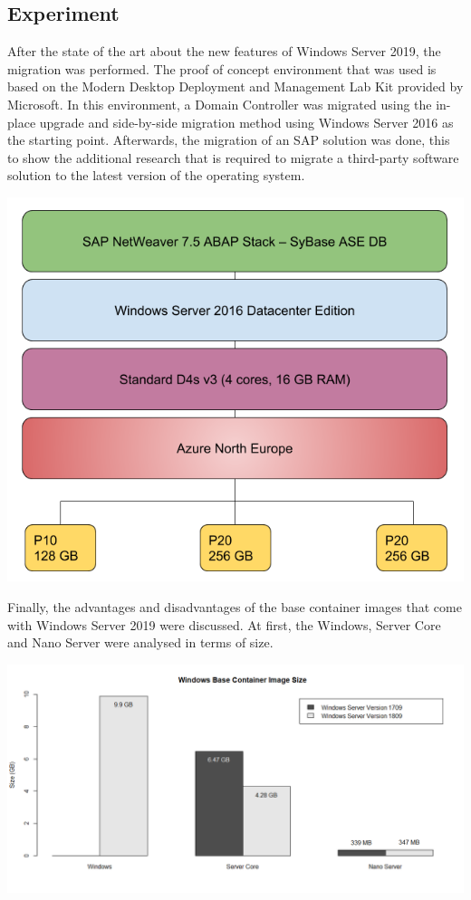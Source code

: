 \documentclass[a0,portrait]{a0poster}
\begin{document}
\begin{multicols}{2}
\section*{Experiment}
\color{black}
After the state of the art about the new features of Windows Server 2019, the migration was performed.
The proof of concept environment that was used is based on the Modern Desktop Deployment and Management Lab Kit provided by Microsoft. 
In this environment, a Domain Controller was migrated using the in-place upgrade and side-by-side migration method using Windows Server 2016 as the starting point.
Afterwards, the migration of an SAP solution was done, this to show the additional research that is required to migrate a third-party software solution to the latest version of the operating system. 
\begin{center}\vspace{0.1cm}
    \includegraphics[width=\linewidth]{../bachproef/img/Methodologie/SAP_PO}
\end{center}\vspace{0.1cm}
Finally, the advantages and disadvantages of the base container images that come with Windows Server 2019 were discussed.
At first, the Windows, Server Core and Nano Server were analysed in terms of size.
\begin{center}\vspace{0.1cm}
    \includegraphics[width=\linewidth]{../bachproef/img/Methodologie/Containers0}

\end{center}
\end{multicols}
\end{document}
